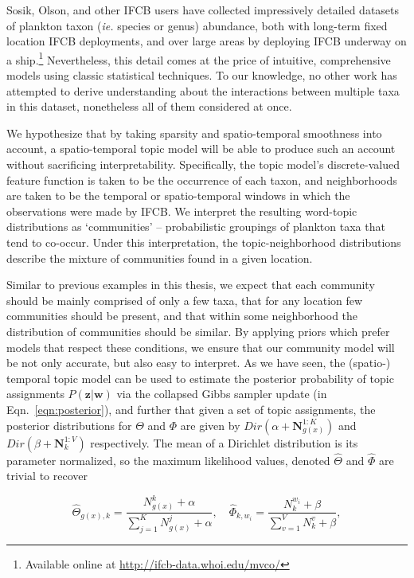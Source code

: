 Sosik, Olson, and other IFCB users have collected impressively detailed datasets of plankton taxon (\emph{ie.} species or genus) abundance, both with long-term fixed location IFCB deployments, and over large areas by deploying IFCB underway on a ship.\footnote{Available online at \url{http://ifcb-data.whoi.edu/mvco/}}
Nevertheless, this detail comes at the price of intuitive, comprehensive models using classic statistical techniques. To our knowledge, no other work has attempted to derive understanding about the interactions between multiple taxa in this dataset, nonetheless all of them considered at once.

We hypothesize that by taking sparsity and spatio-temporal smoothness into account, a spatio-temporal topic model will be able to produce such an account without sacrificing interpretability. Specifically, the topic model's discrete-valued feature function is taken to be the occurrence of each taxon, and neighborhoods are taken to be the temporal or spatio-temporal windows in which the observations were made by IFCB. We interpret the resulting word-topic distributions as `communities' -- probabilistic groupings of plankton taxa that tend to co-occur. Under this interpretation, the topic-neighborhood distributions describe the mixture of communities found in a given location.

Similar to previous examples in this thesis, we expect that each community should be mainly comprised of only a few taxa, that for any location few communities should be present, and that within some neighborhood the distribution of communities should be similar. By applying priors which prefer models that respect these conditions, we ensure that our community model will be not only accurate, but also easy to interpret.  As we have seen, the (spatio-) temporal topic model can be used to estimate the posterior probability of topic assignments $P(\boldsymbol{z} | \boldsymbol{w})$ via the collapsed Gibbs sampler update (in Eqn.~\ref{eqn:posterior}), and further that given a set of topic assignments, the posterior distributions for $\Theta$ and $\Phi$ are given by $Dir(\alpha + \boldsymbol{N}_{g(x)}^{1:K})$ and $Dir(\beta + \boldsymbol{N}_k^{1:V})$ respectively. The mean of a Dirichlet distribution is its parameter normalized, so the maximum likelihood values, denoted $\hat{\Theta}$ and $\hat{\Phi}$ are trivial to recover

\begin{equation} \label{eqn:mle_thetaphi}
\hat{\Theta}_{g(x), k} = \frac{N^k_{g(x)} + \alpha}{\sum_{j=1}^K N^j_{g(x)} + \alpha}, \quad
\hat{\Phi}_{k,w_i} = \frac{N^{w_i}_k + \beta}{\sum_{v=1}^V N^v_k + \beta},
\end{equation}

